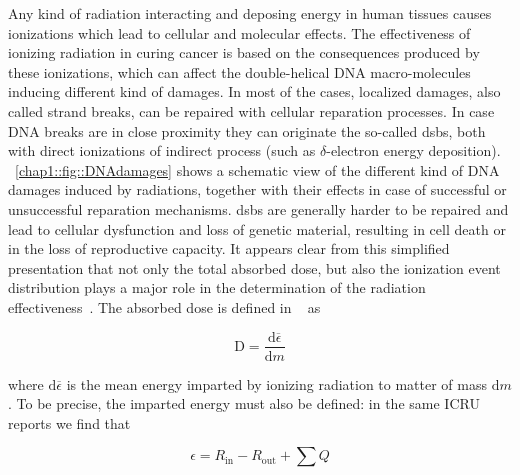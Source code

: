 Any kind of radiation interacting and deposing energy in human tissues causes ionizations which lead to cellular and molecular effects. The effectiveness of ionizing radiation in curing cancer is based on the consequences produced by these ionizations, which can affect the double-helical DNA macro-molecules inducing different kind of damages. In most of the cases, localized damages, also called strand breaks, can be repaired with cellular reparation processes. In case DNA breaks are in close proximity they can originate the so-called \glspl{dsb}, both with direct ionizations of indirect process (such as $\delta$-electron energy deposition). \figurename~\ref{chap1::fig::DNAdamages} shows a schematic view of the different kind of DNA damages induced by radiations, together with their effects in case of  successful or unsuccessful reparation mechanisms. \glspl{dsb} are generally harder to be repaired and lead to cellular dysfunction and loss of genetic material, resulting in cell death or in the loss of reproductive capacity. It appears clear from this simplified presentation that not only the total absorbed dose, but also the ionization event distribution plays a major role in the determination of the radiation effectiveness~\parencite{Belli1992}.        
The absorbed dose is defined in ~\cite{ICRU1980, ICRU1998} as 

\begin{equation}
\mathrm{D} = \frac{\mathrm{d}\overline{\epsilon}}{\mathrm{d}m}
\label{chap1::eq::AbsDoseDef}
\end{equation}

where $\mathrm{d}\overline{\epsilon}$ is the mean energy imparted by ionizing radiation to matter of mass $\mathrm{d}m$. To be precise, the imparted energy must also be defined: in the same ICRU reports we find that 

\begin{equation}
\epsilon = R_{\mathrm{in}} - R_{\mathrm{out}} + \sum{Q}
\label{chap1::eq::impEnergyDef}
\end{equation}

